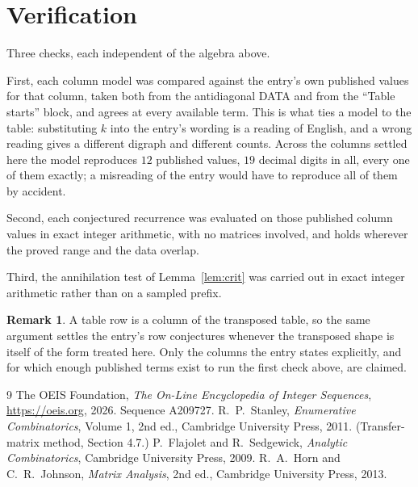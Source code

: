 \documentclass[11pt,a4paper]{article}
\theoremstyle{plain}
\theoremstyle{definition}
\newtheorem{remark}[theorem]{Remark}
\begin{document}
\section{Verification}

Three checks, each independent of the algebra above.

First, each column model was compared against the entry's own published values for that
column, taken both from the antidiagonal DATA and from the ``Table starts'' block, and agrees
at every available term. This is what ties a model to the table: substituting $k$ into the
entry's wording is a reading of English, and a wrong reading gives a different digraph and
different counts. Across the columns settled here the model reproduces $12$ published
values, $19$ decimal digits in all, every one of them exactly; a misreading of the entry
would have to reproduce all of them by accident.

Second, each conjectured recurrence was evaluated on those published column values in exact
integer arithmetic, with no matrices involved, and holds wherever the proved range and the
data overlap.

Third, the annihilation test of Lemma~\ref{lem:crit} was carried out in exact integer
arithmetic rather than on a sampled prefix.

\begin{remark}
A table row is a column of the transposed table, so the same argument settles the entry's row
conjectures whenever the transposed shape is itself of the form treated here. Only the columns
the entry states explicitly, and for which enough published terms exist to run the first check
above, are claimed.
\end{remark}

\begin{thebibliography}{9}
 The OEIS Foundation, \emph{The On-Line Encyclopedia of Integer
Sequences}, \url{https://oeis.org}, 2026. Sequence A209727.
 R.~P.~Stanley, \emph{Enumerative Combinatorics}, Volume 1, 2nd ed.,
Cambridge University Press, 2011. (Transfer-matrix method, Section 4.7.)
 P.~Flajolet and R.~Sedgewick, \emph{Analytic Combinatorics}, Cambridge
University Press, 2009.
 R.~A.~Horn and C.~R.~Johnson, \emph{Matrix Analysis}, 2nd ed., Cambridge
University Press, 2013.
\end{thebibliography}
\end{document}
